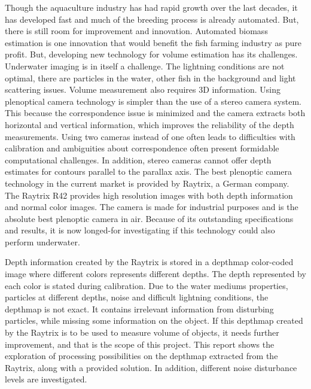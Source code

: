 Though the aquaculture industry has had rapid growth over the last decades, it has developed fast and much of the breeding process is already automated. But, there is still room for improvement and innovation. Automated biomass estimation is one innovation that would benefit the fish farming industry as pure profit.
But, developing new technology for volume estimation has its challenges.
Underwater imaging is in itself a challenge. The lightning conditions are not optimal, there are particles in the water, other fish in the background and light scattering issues. Volume measurement also requires 3D information. 
Using plenoptical camera technology is simpler than the use of a stereo camera system. This because the correspondence issue is minimized and the camera extracts both horizontal and vertical information, which improves the reliability of the depth measurements. Using two cameras instead of one often leads to difficulties with calibration and ambiguities about correspondence often present formidable computational challenges. In addition, stereo cameras cannot offer depth estimates for contours parallel to the parallax axis.\cite{article:stereo_vs_plenoptic}
The best plenoptic camera technology in the current market is provided by Raytrix, a German company.\cite{article:plenoptic_camera} The Raytrix R42 provides high resolution images with both depth information and normal color images. The camera is made for industrial purposes and is the absolute best plenoptic camera in air. Because of its outstanding specifications and results, it is now longed-for investigating if this technology could also perform underwater. 

Depth information created by the Raytrix is stored in a depthmap color-coded image where different colors represents different depths. The depth represented by each color is stated during calibration. Due to the water mediums properties, particles at different depths, noise and difficult lightning conditions, the depthmap is not exact. It contains irrelevant information from disturbing particles, while missing some information on the object. 
If this depthmap created by the Raytrix is to be used to measure volume of objects, it needs further improvement, and that is the scope of this project. 
This report shows the exploration of processing possibilities on the depthmap extracted from the Raytrix, along with a provided solution. In addition, different noise disturbance levels are investigated.




